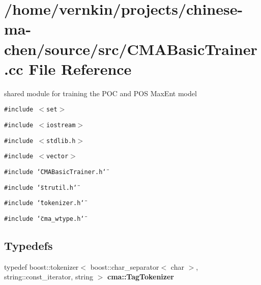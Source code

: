 \section{/home/vernkin/projects/chinese-ma-chen/source/src/CMABasicTrainer.cc File Reference}
\label{CMABasicTrainer_8cc}
shared module for training the POC and POS MaxEnt model  


{\tt \#include $<$set$>$}\par
{\tt \#include $<$iostream$>$}\par
{\tt \#include $<$stdlib.h$>$}\par
{\tt \#include $<$vector$>$}\par
{\tt \#include \char`\"{}CMABasicTrainer.h\char`\"{}}\par
{\tt \#include \char`\"{}strutil.h\char`\"{}}\par
{\tt \#include \char`\"{}tokenizer.h\char`\"{}}\par
{\tt \#include \char`\"{}cma\_\-wtype.h\char`\"{}}\par
\subsection*{Typedefs}
\begin{CompactItemize}
\item 
typedef boost::tokenizer$<$ boost::char\_\-separator$<$ char $>$, string::const\_\-iterator, string $>$ \textbf{cma::TagTokenizer}\label{namespacecma_a0c6c2dc82197fc6600c20a59cade565}

\end{CompactItemize}
